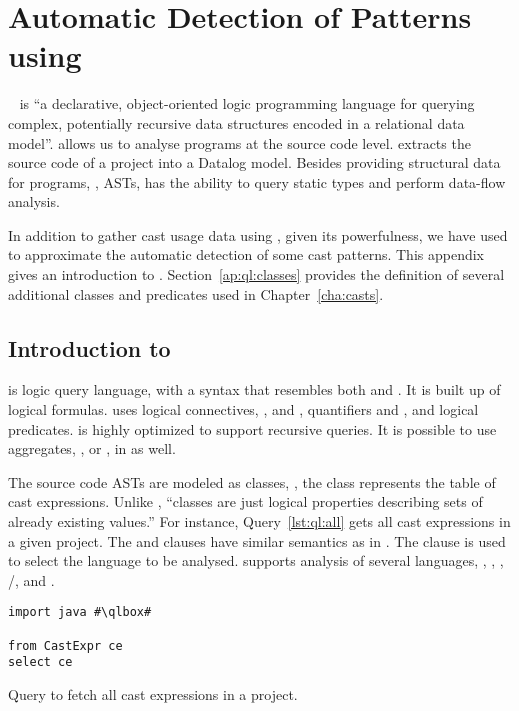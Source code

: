 \chapter{Automatic Detection of Patterns using \ql{}}
\label{ap:ql}

\ql{}~\citep{avgustinovQLObjectorientedQueries2016} is ``a declarative, object-oriented logic programming language for querying complex,
potentially recursive data structures encoded in a relational data
model''.
\ql{} allows us to analyse programs at the source code level.
\ql{} extracts the source code of a project into a Datalog model.
Besides providing structural data for programs, \ie{}, ASTs,
\ql{} has the ability to query static types and perform data-flow analysis.

In addition to gather cast usage data using \ql{}, given its powerfulness,
we have used \ql{} to approximate the automatic detection of some cast patterns.
This appendix gives an introduction to \ql{}.
Section~\ref{ap:ql:classes} provides the definition of several additional classes and predicates used in Chapter~\ref{cha:casts}.

\section{Introduction to \ql{}}

\ql{} is logic query language,
with a syntax that resembles both \sql{} and \java{}.
It is built up of logical formulas.
\ql{} uses logical connectives, \eg{},  and ,
quantifiers  and , and logical predicates.
\ql{} is highly optimized to support recursive queries.
It is possible to use aggregates, \eg{},  or , in \ql{} as well.

The source code ASTs are modeled as \ql{} classes,
\eg{}, the  class represents the table of cast expressions.
Unlike \java{},
\ql{} ``classes are just logical properties describing sets of already existing values.''%
For instance, Query~\ref{lst:ql:all} gets all cast expressions in a given project.
The  and  clauses have similar semantics as in \sql{}.
The  clause is used to select the language to be analysed.
\ql{} supports analysis of several languages,
\eg{}, \javascript{}, \python{}, \cc{}/\cpp{}, and \csharp{}.

\begin{listing}
\begin{verbatim}
import java #\qlbox#

from CastExpr ce
select ce
\end{verbatim}
\caption{Query to fetch all cast expressions in a project.}
\label{lst:ql:all}
\end{listing}

